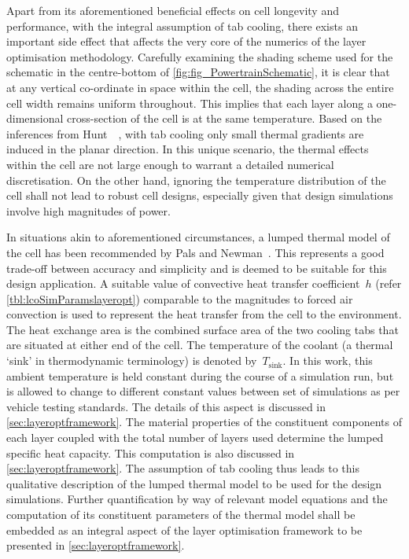 Apart  from  its  aforementioned  beneficial   effects  on  cell  longevity  and
performance,  with the  integral  assumption  of tab  cooling,  there exists  an
important side effect  that affects the very  core of the numerics  of the layer
optimisation methodology.  Carefully examining the  shading scheme used  for the
schematic  in the  centre-bottom  of  \cref{fig:fig_PowertrainSchematic}, it  is
clear that  at any vertical  co-ordinate in space  within the cell,  the shading
across the entire cell width remains  uniform throughout. This implies that each
layer  along  a  one-dimensional  cross-section  of the  cell  is  at  the  same
temperature. Based  on the inferences from  Hunt~\etal~\cite{Hunt2016}, with tab
cooling only  small thermal gradients  are induced  in the planar  direction. In
this unique scenario,  the thermal effects within the cell  are not large enough
to warrant a detailed numerical discretisation.  On the other hand, ignoring the
temperature distribution  of the  cell shall  not lead  to robust  cell designs,
especially given that design simulations involve high magnitudes of power.

In  situations akin  to  aforementioned circumstances,  a  lumped thermal  model
of  the cell  has  been  recommended by  Pals  and Newman~\cite{Pals1995}.  This
represents a good trade-off between accuracy  and simplicity and is deemed to be
suitable  for this  design  application.  A suitable  value  of convective  heat
transfer coefficient~$h$  (refer \cref{tbl:lcoSimParamslayeropt})  comparable to
the  magnitudes  to  forced  air  convection  is  used  to  represent  the  heat
transfer  from the  cell  to the  environment.  The heat  exchange  area is  the
combined  surface area  of the  two  cooling tabs  that are  situated at  either
end  of  the  cell.  The  temperature  of  the  coolant  (a  thermal  `sink'  in
thermodynamic  terminology) is  denoted by~$T_\text{sink}$.  In this  work, this
ambient temperature is held constant during  the course of a simulation run, but
is allowed to change to different  constant values between set of simulations as
per  vehicle  testing  standards.  The  details  of  this  aspect  is  discussed
in  \cref{sec:layeroptframework}. The  material  properties  of the  constituent
components of each layer coupled with  the total number of layers used determine
the  lumped  specific heat  capacity.  This  computation  is also  discussed  in
\cref{sec:layeroptframework}. The assumption  of tab cooling thus  leads to this
qualitative description  of the lumped thermal  model to be used  for the design
simulations. Further quantification  by way of relevant model  equations and the
computation of its constituent parameters of the thermal model shall be embedded
as an  integral aspect of  the layer optimisation  framework to be  presented in
\cref{sec:layeroptframework}.

